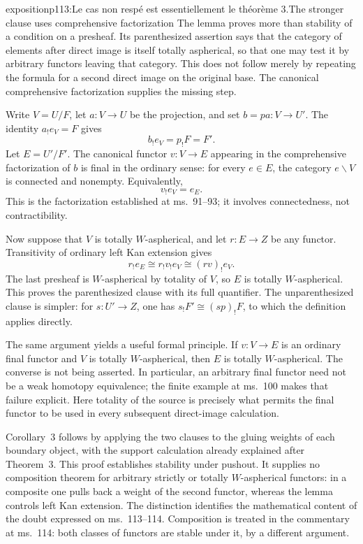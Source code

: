 \begin{dcomment}{exposition}{p113:Le cas non respé est essentiellement le théorème 3.}{The stronger clause uses comprehensive factorization}
The lemma proves more than stability of a condition on a presheaf. Its parenthesized assertion says that the category of elements after direct image is itself totally aspherical, so that one may test it by arbitrary functors leaving that category. This does not follow merely by repeating the formula for a second direct image on the original base. The canonical comprehensive factorization supplies the missing step.

Write $V=U/F$, let $a:V\to U$ be the projection, and set $b=pa:V\to U'$. The identity $a_!e_V=F$ gives
\[
 b_!e_V=p_!F=F'.
\]
Let $E=U'/F'$. The canonical functor $v:V\to E$ appearing in the comprehensive factorization of $b$ is final in the ordinary sense: for every $e\in E$, the category $e\backslash V$ is connected and nonempty. Equivalently,
\[
 v_!e_V=e_E.
\]
This is the factorization established at ms.~91--93; it involves connectedness, not contractibility.

Now suppose that $V$ is totally $W$-aspherical, and let $r:E\to Z$ be any functor. Transitivity of ordinary left Kan extension gives
\[
 r_!e_E\cong r_!v_!e_V\cong(rv)_!e_V.
\]
The last presheaf is $W$-aspherical by totality of $V$, so $E$ is totally $W$-aspherical. This proves the parenthesized clause with its full quantifier. The unparenthesized clause is simpler: for $s:U'\to Z$, one has $s_!F'\cong(sp)_!F$, to which the definition applies directly.

The same argument yields a useful formal principle. If $v:V\to E$ is an ordinary final functor and $V$ is totally $W$-aspherical, then $E$ is totally $W$-aspherical. The converse is not being asserted. In particular, an arbitrary final functor need not be a weak homotopy equivalence; the finite example at ms.~100 makes that failure explicit. Here totality of the source is precisely what permits the final functor to be used in every subsequent direct-image calculation.

Corollary~3 follows by applying the two clauses to the gluing weights of each boundary object, with the support calculation already explained after Theorem~3. This proof establishes stability under pushout. It supplies no composition theorem for arbitrary strictly or totally $W$-aspherical functors: in a composite one pulls back a weight of the second functor, whereas the lemma controls left Kan extension. The distinction identifies the mathematical content of the doubt expressed on ms.~113--114. Composition is treated in the commentary at ms.~114: both classes of functors are stable under it, by a different argument.
\end{dcomment}

